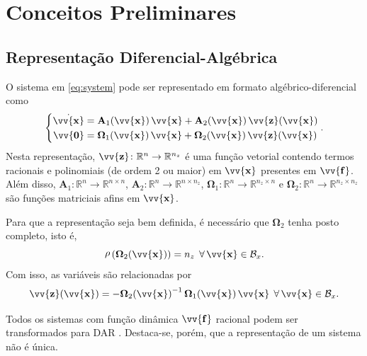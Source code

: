 \documentclass{ppgeesa}
\DeclareMathOperator{\rank}{\rho}
\newcommand*{\Round}[1]{\left(#1\right)}
\newcommand*{\Prod}{\,}
\newcommand*{\Bold}[1]{\boldsymbol{\mathbf{#1}}}
\newcommand*{\Matr}[1]{\Bold{#1}}
\newcommand*{\Vect}[1]{\vv{\Bold{#1}}}
\newcommand*{\Inv}[1]{{#1}^{-1}}
\newcommand*{\Rank}[1]{\rank\Round{#1}}
\newcommand*{\ForAll}{\:\:\forall\,}
\begin{document}
\section{Conceitos Preliminares}

\subsection{Representação Diferencial-Algébrica}
O sistema em \eqref{eq:system} pode ser representado em formato algébrico-diferencial como
\begin{equation}
  \left\{\begin{aligned}
    \dot{\Vect{x}} &= \Matr{A}_1(\Vect{x}) \Prod \Vect{x} + \Matr{A}_2(\Vect{x}) \Prod \Vect{z}(\Vect{x})
    \\
    \Vect{0} &= \Matr{\Omega}_1(\Vect{x}) \Prod \Vect{x} + \Matr{\Omega}_2(\Vect{x}) \Prod \Vect{z}(\Vect{x})
  \end{aligned}\right.
  .
\end{equation}
Nesta representação, $\Vect{z} \colon \mathbb{R}^n \to \mathbb{R}^{n_z}$ é uma função vetorial contendo termos racionais e polinomiais (de ordem 2 ou maior) em $\Vect{x}$ presentes em $\Vect{f}$.
Além disso, $\Matr{A}_1 \colon \mathbb{R}^n \to \mathbb{R}^{n \times n}$, $\Matr{A}_2 \colon \mathbb{R}^n \to \mathbb{R}^{n \times n_z}$, $\Matr{\Omega}_1 \colon \mathbb{R}^n \to \mathbb{R}^{n_z \times n}$ e $\Matr{\Omega}_2 \colon \mathbb{R}^n \to \mathbb{R}^{n_z \times n_z}$ são funções matriciais afins em $\Vect{x}$.

Para que a representação seja bem definida, é necessário que $\Matr{\Omega}_2$ tenha posto completo, isto é,
\begin{equation}
  \Rank{\Matr{\Omega}_2(\Vect{x})} = n_z \ForAll \Vect{x} \in \mathcal{B}_x
  .
\end{equation}
Com isso, as variáveis são relacionadas por
\begin{equation}
  \Vect{z}(\Vect{x}) = -\Inv{\Matr{\Omega}_2(\Vect{x})} \Prod \Matr{\Omega}_1(\Vect{x}) \Prod \Vect{x}
  \ForAll \Vect{x} \in \mathcal{B}_x
  .
\end{equation}

Todos os sistemas com função dinâmica $\Vect{f}$ racional podem ser transformados para DAR \cite{article:Coutinho2010}.
Destaca-se, porém, que a representação de um sistema não é única.
\end{document}
